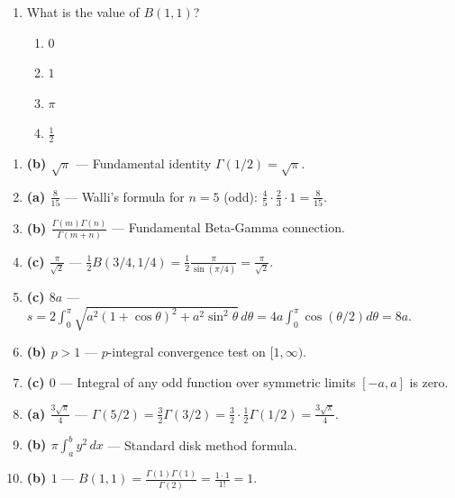 \begin{enumerate}[leftmargin=1.5em]
    \item What is the value of $B(1, 1)$?
    \begin{enumerate}[label=(\alph*)]
        \item $0$
        \item $1$
        \item $\pi$
        \item $\frac{1}{2}$
    \end{enumerate}
\end{enumerate}

\begin{solutionbox}
\begin{enumerate}
    \item \textbf{(b) $\sqrt{\pi}$} --- Fundamental identity $\Gamma(1/2) = \sqrt{\pi}$.
    \item \textbf{(a) $\frac{8}{15}$} --- Walli's formula for $n=5$ (odd): $\frac{4}{5} \cdot \frac{2}{3} \cdot 1 = \frac{8}{15}$.
    \item \textbf{(b) $\frac{\Gamma(m)\Gamma(n)}{\Gamma(m+n)}$} --- Fundamental Beta-Gamma connection.
    \item \textbf{(c) $\frac{\pi}{\sqrt{2}}$} --- $\frac{1}{2}B(3/4, 1/4) = \frac{1}{2}\frac{\pi}{\sin(\pi/4)} = \frac{\pi}{\sqrt{2}}$.
    \item \textbf{(c) $8a$} --- $s = 2 \int_0^\pi \sqrt{a^2(1+\cos\theta)^2 + a^2\sin^2\theta}\,d\theta = 4a\int_0^\pi \cos(\theta/2)d\theta = 8a$.
    \item \textbf{(b) $p > 1$} --- $p$-integral convergence test on $[1, \infty)$.
    \item \textbf{(c) $0$} --- Integral of any odd function over symmetric limits $[-a, a]$ is zero.
    \item \textbf{(a) $\frac{3\sqrt{\pi}}{4}$} --- $\Gamma(5/2) = \frac{3}{2}\Gamma(3/2) = \frac{3}{2} \cdot \frac{1}{2}\Gamma(1/2) = \frac{3\sqrt{\pi}}{4}$.
    \item \textbf{(b) $\pi \int_a^b y^2\,dx$} --- Standard disk method formula.
    \item \textbf{(b) $1$} --- $B(1,1) = \frac{\Gamma(1)\Gamma(1)}{\Gamma(2)} = \frac{1 \cdot 1}{1!} = 1$.
\end{enumerate}
\end{solutionbox}

